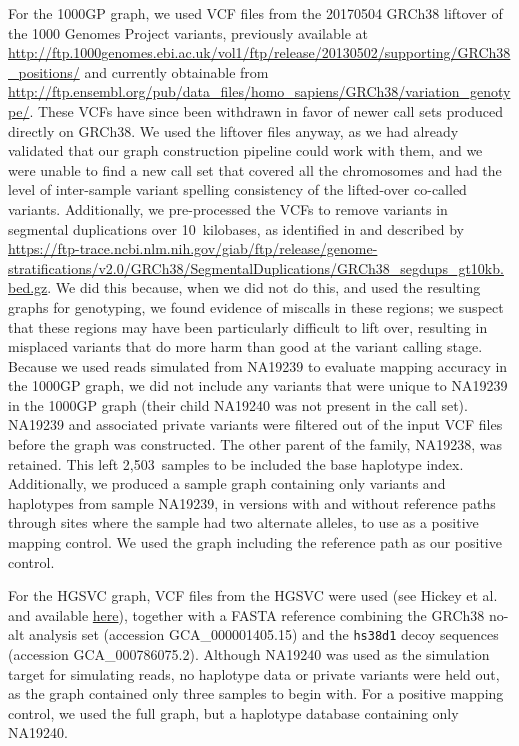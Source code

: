 \documentclass[11pt]{ucscthesis}
\begin{document}
For the 1000GP graph, we used VCF files from the 20170504 GRCh38 liftover of the 1000 Genomes Project variants, previously available at \url{http://ftp.1000genomes.ebi.ac.uk/vol1/ftp/release/20130502/supporting/GRCh38_positions/} and currently obtainable from \url{http://ftp.ensembl.org/pub/data_files/homo_sapiens/GRCh38/variation_genotype/}.
These VCFs have since been withdrawn in favor of newer call sets produced directly on GRCh38.
We used the liftover files anyway, as we had already validated that our graph construction pipeline could work with them, and we were unable to find a new call set that covered all the chromosomes and had the level of inter-sample variant spelling consistency of the lifted-over co-called variants.
Additionally, we pre-processed the VCFs to remove variants in segmental duplications over 10~kilobases, as identified in \cite{giab_benchmark_2019} and described by \url{https://ftp-trace.ncbi.nlm.nih.gov/giab/ftp/release/genome-stratifications/v2.0/GRCh38/SegmentalDuplications/GRCh38_segdups_gt10kb.bed.gz}.
We did this because, when we did not do this, and used the resulting graphs for genotyping, we found evidence of miscalls in these regions; we suspect that these regions may have been particularly difficult to lift over, resulting in misplaced variants that do more harm than good at the variant calling stage.
Because we used reads simulated from NA19239 to evaluate mapping accuracy in the 1000GP graph, we did not include any variants that were unique to NA19239 in the 1000GP graph (their child NA19240 was not present in the call set).
NA19239 and associated private variants were filtered out of the input VCF files before the graph was constructed.
The other parent of the family, NA19238, was retained.
This left 2,503~samples to be included the base haplotype index.
Additionally, we produced a sample graph containing only variants and haplotypes from sample NA19239, in versions with and without reference paths through sites where the sample had two alternate alleles, to use as a positive mapping control.
We used the graph including the reference path as our positive control.

For the HGSVC graph, VCF files from the HGSVC were used (see Hickey et al.\cite{hickey_vgsv_2020} and available \href{https://github.com/vgteam/sv-genotyping-paper/tree/master/human/hgsvc}{{here}}), together with a FASTA reference combining the GRCh38 no-alt analysis set (accession GCA\_000001405.15) and the \texttt{hs38d1} decoy sequences (accession GCA\_000786075.2).
Although NA19240 was used as the simulation target for simulating reads, no haplotype data or private variants were held out, as the graph contained only three samples to begin with. For a positive mapping control, we used the full graph, but a haplotype database containing only NA19240.
\end{document}
